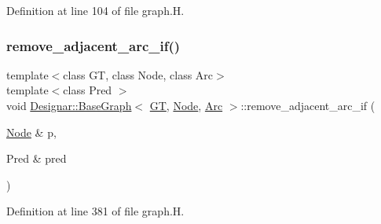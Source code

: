 Definition at line 104 of file graph.\+H.

\mbox{\label{class_designar_1_1_base_graph_af1653bc8e50c53d27997951798a8a716}} 
\subsubsection{\texorpdfstring{remove\+\_\+adjacent\+\_\+arc\+\_\+if()}{remove\_adjacent\_arc\_if()}\hspace{0.1cm}{\footnotesize\ttfamily [1/2]}}
{\footnotesize\ttfamily template$<$class GT, class Node, class Arc$>$ \\
template$<$class Pred $>$ \\
void \hyperlink{class_designar_1_1_base_graph}{Designar\+::\+Base\+Graph}$<$ \hyperlink{demo-buildgraph_8_c_a3001c40d2c31ca87ed96cd7d1334a55e}{GT}, \hyperlink{namespace_designar_a5af326c65aa2bd26b26c410f2030d09e}{Node}, \hyperlink{namespace_designar_a3f55fb5513d62ff47cbc8f72b8e95d6f}{Arc} $>$\+::remove\+\_\+adjacent\+\_\+arc\+\_\+if (\begin{DoxyParamCaption}\item[{\hyperlink{namespace_designar_a5af326c65aa2bd26b26c410f2030d09e}{Node} \&}]{p,  }\item[{Pred \&}]{pred }\end{DoxyParamCaption})\hspace{0.3cm}{\ttfamily [inline]}}



Definition at line 381 of file graph.\+H.

\mbox{\label{class_designar_1_1_base_graph_a10423075ea81c629e88974fa882ec903}} 
